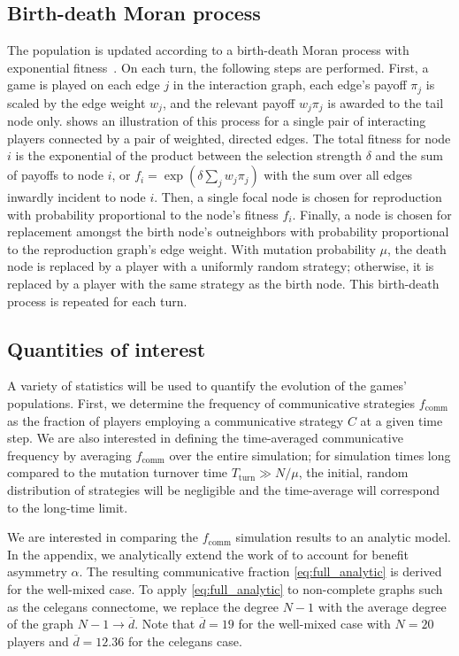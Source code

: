\documentclass[pdflatex,lineno,referee,sn-nature]{sn-jnl}
\begin{document}
\subsection{Birth-death Moran process}
\label{sec:evo_setup}
The population is updated according to a birth-death Moran process
with exponential fitness~\citep[\eg \cf][]{lieberman2005evolutionary}.
On each turn, the following steps are performed.
First, a game is played on each edge $j$ in the interaction graph,
each edge's payoff $\pi_j$ is scaled by the edge weight $w_j$,
and the relevant payoff $w_j \pi_j$ is awarded to the tail node only.
 shows an illustration of this process
for a single pair of interacting players connected by a pair of
weighted, directed edges.
The total fitness for node $i$ is the exponential of the product
between the selection strength $\delta$
and the sum of payoffs to node $i$,
or $f_i = \exp(\delta \sum_j w_j \pi_j)$ with the sum
over all edges inwardly incident to node $i$.
Then, a single focal node is chosen for reproduction
with probability proportional to the node's fitness $f_i$.
Finally, a node is chosen for replacement amongst the birth node's outneighbors
with probability proportional to the reproduction graph's edge weight.
With mutation probability $\mu$,
the death node is replaced by a player with a uniformly random strategy;
otherwise, it is replaced by a player with the same strategy as the birth node.
This birth-death process is repeated for each turn.

\subsection{Quantities of interest}
\label{sec:stats_setup}
A variety of statistics will be used to quantify the evolution
of the games' populations.
First, we determine the frequency of communicative strategies
$f_{\text{comm}}$ as the fraction of players employing
a communicative strategy $C$ at a given time step.
We are also interested in defining the time-averaged communicative frequency
by averaging $f_{\text{comm}}$ over the entire simulation;
for simulation times long compared to the mutation turnover time
$T_{\text{turn}} \gg N/\mu$,
the initial, random distribution of strategies will be negligible
and the time-average will correspond to the long-time limit.

We are interested in comparing the $f_{\text{comm}}$ simulation results
to an analytic model.
In the appendix, we analytically extend the work of \tripp{}
to account for benefit asymmetry $\alpha$.
The resulting communicative fraction \cref{eq:full_analytic}
is derived for the well-mixed case.
To apply \cref{eq:full_analytic} to non-complete graphs such as
the \gls{celegans} connectome,
we replace the degree $N-1$ with the average degree of the graph
$N-1 \to \overline{d}$.
Note that $\overline{d} = \num{19}$
for the well-mixed case with $N=20$ players
and $\overline{d} = \num{12.36}$ for the \gls{celegans} case.
\end{document}
